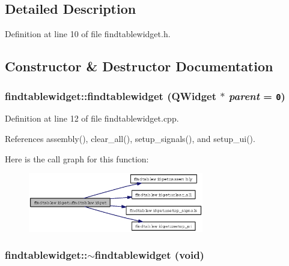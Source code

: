 \subsection{Detailed Description}




Definition at line 10 of file findtablewidget.h.

\subsection{Constructor \& Destructor Documentation}
\subsubsection{\setlength{\rightskip}{0pt plus 5cm}findtablewidget::findtablewidget (QWidget $\ast$ {\em parent} = {\tt 0})}\label{classfindtablewidget_d653e969acddfa20ca21e34dca7b40f5}




Definition at line 12 of file findtablewidget.cpp.

References assembly(), clear\_\-all(), setup\_\-signals(), and setup\_\-ui().

Here is the call graph for this function:\begin{figure}[H]
\begin{center}
\leavevmode
\includegraphics[width=217pt]{classfindtablewidget_d653e969acddfa20ca21e34dca7b40f5_cgraph}
\end{center}
\end{figure}
\subsubsection{\setlength{\rightskip}{0pt plus 5cm}findtablewidget::$\sim$findtablewidget (void)\hspace{0.3cm}{\tt  [virtual]}}\label{classfindtablewidget_08b5c9450513c0f36e5d20c0d401c0d0}




